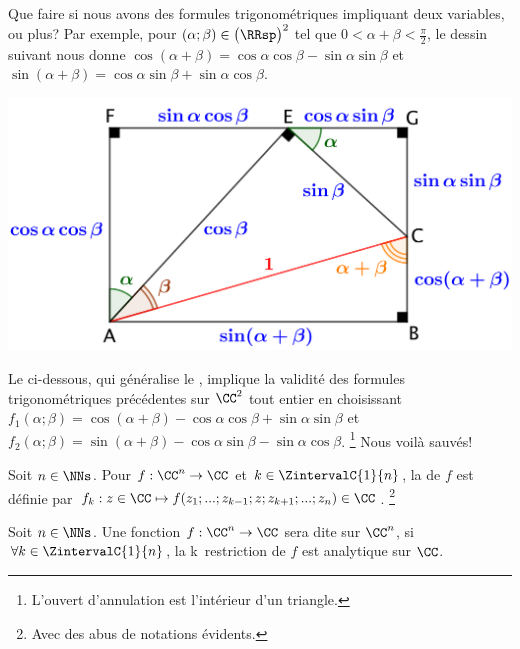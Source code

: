 Que faire si nous avons des formules trigonométriques impliquant deux variables, ou plus?
Par exemple,
pour
$(\alpha ; \beta) \in \big( \RRsp \big)^2$ tel que $0 < \alpha + \beta < \frac{\pi}{2}$,
le dessin suivant nous donne
$\cos(\alpha + \beta) = \cos \alpha \cos \beta - \sin \alpha \sin \beta$
et
$\sin(\alpha + \beta) = \cos \alpha \sin \beta + \sin \alpha \cos \beta$.%

\begin{center}
	\includegraphics[scale=.7]{add-trigo-formulas.png}
\end{center}

Le  ci-dessous, qui généralise le , implique la validité des formules trigonométriques précédentes sur $\CC^2$ tout entier en choisissant
$f_1(\alpha ; \beta) = \cos(\alpha + \beta) - \cos \alpha \cos \beta + \sin \alpha \sin \beta$
et
$f_2(\alpha ; \beta) = \sin(\alpha + \beta) - \cos \alpha \sin \beta - \sin \alpha \cos \beta$.%
\footnote{
    L'ouvert d'annulation est l'intérieur d'un triangle.
}
Nous voilà sauvés!




\begin{defi}
    Soit $n \in \NNs$.
    Pour $f: \CC^n \rightarrow \CC$
    et
    $k \in \ZintervalC{1}{n}$,
    la  de $f$ est définie par
    $f_k: z \in \CC \mapsto f(z_1 ; ... ; z_{k-1} ; z ; z_{k+1} ; ... ; z_n) \in \CC$.%
	\footnote{
		Avec des abus de notations évidents.
	}
\end{defi}


\begin{defi}
    Soit $n \in \NNs$.
    Une fonction $f: \CC^n \rightarrow \CC$ sera dite  sur $\CC^n$,
    si $\forall k \in \ZintervalC{1}{n}$,
    la k\ieme\ restriction de $f$ est analytique sur $\CC$.
\end{defi}



